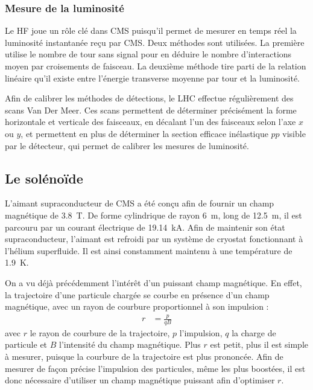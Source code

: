 \subsubsection{Mesure de la luminosité}

Le HF joue un rôle clé dans CMS puisqu'il permet de mesurer en temps réel la luminosité instantanée reçu par CMS. Deux méthodes sont utilisées. La première utilise le nombre de tour sans signal pour en déduire le nombre d'interactions moyen par croisements de faisceau. La deuxième méthode tire parti de la relation linéaire qu'il existe entre l'énergie transverse moyenne par tour et la luminosité.

Afin de calibrer les méthodes de détections, le LHC effectue régulièrement des scans Van Der Meer. Ces scans permettent de déterminer précisément la forme horizontale et verticale des faisceaux, en décalant l'un des faisceaux selon l'axe $x$ ou $y$, et permettent en plus de déterminer la section efficace inélastique $pp$ visible par le détecteur, qui permet de calibrer les mesures de luminosité.

\subsection{Le solénoïde}

L'aimant supraconducteur de CMS a été conçu afin de fournir un champ magnétique de \SI{3.8}{\tesla}. De forme cylindrique de rayon \SI{6}{\m}, long de \SI{12.5}{\meter}, il est parcouru par un courant électrique de \SI{19.14}{\kilo\ampere}. Afin de maintenir son état supraconducteur, l'aimant est refroidi par un système de cryostat fonctionnant à l'hélium superfluide. Il est ainsi constamment maintenu à une température de \SI{1.9}{\kelvin}.

On a vu déjà précédemment l'intérêt d'un puissant champ magnétique. En effet, la trajectoire d'une particule chargée se courbe en présence d'un champ magnétique, avec un rayon de courbure proportionnel à son impulsion :
\begin{align*}
  r &= \frac{p}{qB}
\end{align*}
avec $r$ le rayon de courbure de la trajectoire, $p$ l'impulsion, $q$ la charge de particule et $B$ l'intensité du champ magnétique. Plus $r$ est petit, plus il est simple à mesurer, puisque la courbure de la trajectoire est plus prononcée. Afin de mesurer de façon précise l'impulsion des particules, même les plus boostées, il est donc nécessaire d'utiliser un champ magnétique puissant afin d'optimiser $r$.

